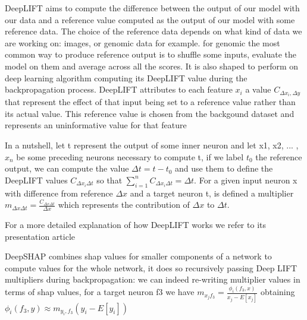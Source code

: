 \documentclass[a4paper,11pt]{article}
\begin{document}
DeepLIFT aims to compute the difference between the output of our model with our data and a reference value computed as the output of our model with some reference data.
The choice of the reference data depends on what kind of data we are working on: images, or genomic data for example.
for genomic the most common way to produce reference output is to shuffle some inputs, evaluate the model on them and average across all the scores.
It is also shaped to perform on deep learning algorithm computing its DeepLIFT value during the backpropagation process.
DeepLIFT attributes to each feature $x_i$ a value $C_{\Delta x_i, \Delta y}$ that represent the effect of that input being set to a reference value rather than its actual value.
This reference value is chosen from the backgound dataset and represents an uninformative value for that feature

In a nutshell, let t represent the output of some inner neuron and let x1, x2, ... , $x_n$ be some preceding neurons necessary to compute t, if we label $t_0$ the reference output, we can compute the value $\Delta t = t-t_0$ and use them to define the DeepLIFT values $C_{\Delta x_i \Delta t}$ so that
$\sum_{i = 1} ^n C_{\Delta x_i \Delta t} = \Delta t$. For a given input neuron x with difference from reference $\Delta x$ and a target neuron t, is defined a multiplier $m_{\Delta x \Delta t} = \frac{C_{\Delta x \Delta t}}{\Delta x}$ which represents the contribution of $\Delta x$ to $\Delta t$.

For a more detailed explanation of how DeepLIFT works we refer to its presentation article \cite{}


DeepSHAP combines shap values for smaller components of a network to compute values for the whole network, it does so recursively passing Deep LIFT multipliers during backpropagation: we can indeed re-writing multiplier values in terms of shap values, for a target neuron f3 we have $m_{x_j f_3} = \frac{\phi_i(f_3, x)}{x_j - E[x_j]}$ obtaining $\phi_i(f_3, y) \approx m_{y_i, f_3}(y_i - E[y_i])$
\end{document}
